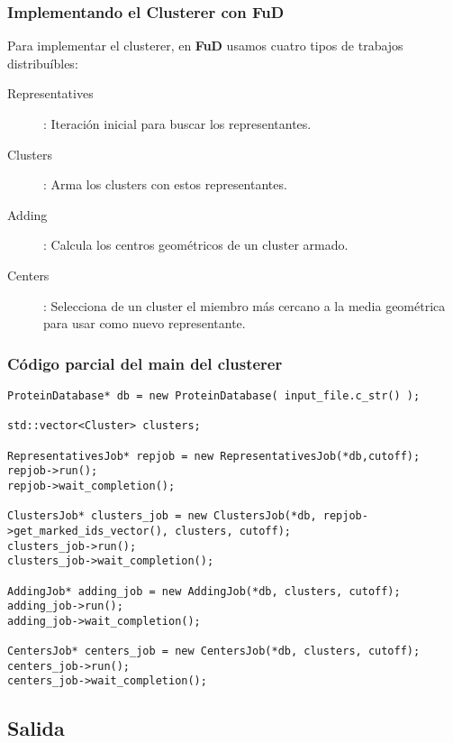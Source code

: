\documentclass[xcolor=pdftex,dvipsnames,table,10pt,babel,spanish]{beamer}
\begin{document}
\begin{frame}
 \frametitle{Implementando el Clusterer con FuD}
 
 Para implementar el clusterer, en \textbf{FuD} usamos cuatro tipos de trabajos distribu\'ibles:
 \pause
 \begin{block}{}
 \begin{description}
 \item[Representatives]: Iteraci\'on inicial para buscar los representantes.
 \pause
 \item[Clusters]: Arma los clusters con estos representantes.
 \pause
 \item[Adding]: Calcula los centros geom\'etricos de un cluster armado.
 \pause
 \item[Centers]: Selecciona de un cluster el miembro m\'as cercano a la media geom\'etrica para usar como nuevo representante.
 \end{description}

 \end{block}

\end{frame}

\begin{frame}[fragile]
 \frametitle{C\'odigo parcial del main del clusterer}
\lstset{language=C++}
\begin{lstlisting}
ProteinDatabase* db = new ProteinDatabase( input_file.c_str() );

std::vector<Cluster> clusters;

RepresentativesJob* repjob = new RepresentativesJob(*db,cutoff);
repjob->run();
repjob->wait_completion();

ClustersJob* clusters_job = new ClustersJob(*db, repjob->get_marked_ids_vector(), clusters, cutoff);
clusters_job->run();
clusters_job->wait_completion();

AddingJob* adding_job = new AddingJob(*db, clusters, cutoff);
adding_job->run();
adding_job->wait_completion();

CentersJob* centers_job = new CentersJob(*db, clusters, cutoff);
centers_job->run();
centers_job->wait_completion();
\end{lstlisting}

\end{frame}

\subsection*{Salida}
\end{document}
